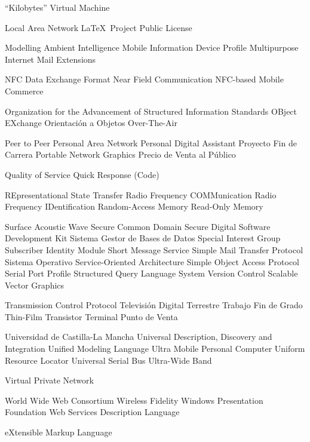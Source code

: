 {\begin{acronym}[XXXXXXXX]
       {``Kilobytes'' Virtual Machine}

       {Local Area Network}
      {\LaTeX~Project Public License}

      {Modelling Ambient Intelligence}
      {Mobile Information Device Profile}
      {Multipurpose Internet Mail Extensions}

      {NFC Data Exchange Format}
       {Near Field Communication}
       {NFC-based Mobile Commerce}

     {Organization for the Advancement of Structured Information Standards}
      {OBject EXchange}
        {Orientación a Objetos}
       {Over-The-Air}

       {Peer to Peer}
       {Personal Area Network}
       {Personal Digital Assistant}
       {Proyecto Fin de Carrera}
       {Portable Network Graphics}
       {Precio de Venta al Público}

       {Quality of Service}
        {Quick Response (Code)}


      {REpresentational State Transfer}
    {Radio Frequency COMMunication}
      {Radio Frequency IDentification}
       {Random-Access Memory}
       {Read-Only Memory}

       {Surface Acoustic Wave}
       {Secure Common Domain}
        {Secure Digital}
       {Software Development Kit}
      {Sistema Gestor de Bases de Datos}
       {Special Interest Group}
       {Subscriber Identity Module}
       {Short Message Service}
      {Simple Mail Transfer Protocol}
        {Sistema Operativo}
       {Service-Oriented Architecture}
      {Simple Object Access Protocol}
       {Serial Port Profile}
       {Structured Query Language}
       {System Version Control}
       {Scalable Vector Graphics}

       {Transmission Control Protocol}
       {Televisión Digital Terrestre}
       {Trabajo Fin de Grado}
       {Thin-Film Transistor}
       {Terminal Punto de Venta}

      {Universidad de Castilla-La Mancha}
      {Universal Description, Discovery and Integration}
       {Unified Modeling Language}
      {Ultra Mobile Personal Computer}
       {Uniform Resource Locator}
       {Universal Serial Bus}
       {Ultra-Wide Band}

       {Virtual Private Network}

       {World Wide Web Consortium}
      {Wireless Fidelity}
       {Windows Presentation Foundation}
      {Web Services Description Language}

       {eXtensible Markup Language}
\end{acronym}
}


